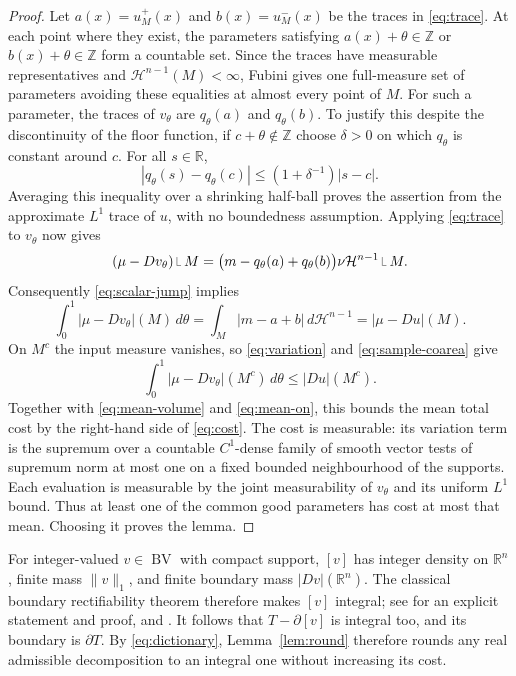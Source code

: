 \documentclass[11pt]{article}
\newcommand{\R}{\mathbb R}
\newcommand{\Z}{\mathbb Z}
\newcommand{\HH}{\mathcal H}
\newcommand{\restr}{\mathbin{\vrule height 1.4ex depth 0pt width .07ex\vrule height .07ex depth 0pt width .65ex}}
\newcommand{\BV}{\operatorname{BV}}
\begin{document}
\begin{proof}
Let $a(x)=u_M^+(x)$ and $b(x)=u_M^-(x)$ be the traces in
\eqref{eq:trace}. At each point where they exist, the parameters satisfying
$a(x)+\theta\in\Z$ or $b(x)+\theta\in\Z$ form a countable set.
Since the traces have measurable representatives and $\HH^{n-1}(M)<\infty$,
Fubini gives one full-measure set of parameters avoiding these equalities
at almost every point of $M$.
For such a parameter, the traces of $v_\theta$ are $q_\theta(a)$ and
$q_\theta(b)$. To justify this despite the discontinuity of the floor
function, if $c+\theta\notin\Z$ choose $\delta>0$ on which $q_\theta$ is
constant around $c$. For all $s\in\R$,
\[
|q_\theta(s)-q_\theta(c)|\le(1+\delta^{-1})|s-c|.
\]
Averaging this inequality over a shrinking half-ball proves the assertion
from the approximate $L^1$ trace of $u$, with no boundedness assumption.
Applying \eqref{eq:trace} to $v_\theta$ now gives
\[
(\mu-Dv_\theta)\restr M
 =\bigl(m-q_\theta(a)+q_\theta(b)\bigr)\nu\HH^{n-1}\restr M.
\]
Consequently \eqref{eq:scalar-jump} implies
\begin{equation}\label{eq:mean-on}
\int_0^1|\mu-Dv_\theta|(M)\,d\theta
=\int_M|m-a+b|\,d\HH^{n-1}=|\mu-Du|(M).
\end{equation}
On $M^c$ the input measure vanishes, so
\eqref{eq:variation} and \eqref{eq:sample-coarea} give
\[
\int_0^1|\mu-Dv_\theta|(M^c)\,d\theta\le|Du|(M^c).
\]
Together with \eqref{eq:mean-volume} and \eqref{eq:mean-on}, this bounds
the mean total cost by the right-hand side of \eqref{eq:cost}.
The cost is measurable: its variation term is the supremum over a countable
$C^1$-dense family of smooth vector tests of supremum norm at most one on a
fixed bounded neighbourhood of the supports. Each evaluation is measurable
by the joint measurability of $v_\theta$ and its uniform $L^1$ bound.
Thus at least one of the common good parameters has cost at most that mean.
Choosing it proves the lemma.
\end{proof}

For integer-valued $v\in\BV$ with compact support, $[v]$ has integer density
on $\R^n$, finite mass $\|v\|_1$, and finite boundary mass $|Dv|(\R^n)$.
The classical boundary rectifiability theorem therefore makes $[v]$ integral;
see \cite[Theorem 1.1]{DelNin} for an explicit statement and proof, and
\cite[Section 1.1]{IKV}. It follows that $T-\partial[v]$ is integral too,
and its boundary is $\partial T$. By \eqref{eq:dictionary},
Lemma~\ref{lem:round} therefore rounds any real admissible decomposition to
an integral one without increasing its cost.
\end{document}
